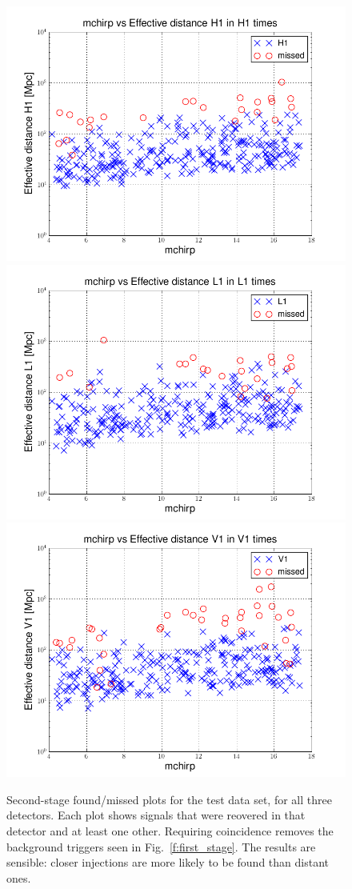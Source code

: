 \begin{figure}
  \includegraphics[width=0.5\linewidth]{figures/ninja2_results/h1-plotinspmissed_full_data_mchirp-eff_dist-log-h1-871147524-606064_second}
  \includegraphics[width=0.5\linewidth]{figures/ninja2_results/l1-plotinspmissed_full_data_mchirp-eff_dist-log-l1-871147524-606064_second} \\
  \includegraphics[width=0.5\linewidth]{figures/ninja2_results/v1-plotinspmissed_full_data_mchirp-eff_dist-log-v1-871147524-606064_second}
  \caption[Second-stage found-missed plots for the test data set]{
  \label{f:test_found_missed}
Second-stage found/missed plots for the test data set, for all three
detectors.  Each plot shows signals that were reovered in that
detector and at least one other.  Requiring coincidence removes the
background triggers seen in Fig.~\ref{f:first_stage}.  The results
are sensible: closer injections are more likely to be found than
distant ones.
}
\end{figure}%


